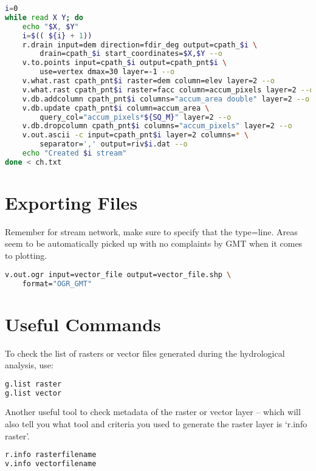 \begin{lstlisting}[language=bash]
i=0
while read X Y; do 
	echo "$X, $Y"
	i=$(( ${i} + 1))
	r.drain input=dem direction=fdir_deg output=cpath_$i \
		drain=cpath_$i start_coordinates=$X,$Y --o 
	v.to.points input=cpath_$i output=cpath_pnt$i \
		use=vertex dmax=30 layer=-1 --o
	v.what.rast cpath_pnt$i raster=dem column=elev layer=2 --o
	v.what.rast cpath_pnt$i raster=facc column=accum_pixels layer=2 --o
	v.db.addcolumn cpath_pnt$i columns="accum_area double" layer=2 --o
	v.db.update cpath_pnt$i column=accum_area \
		query_col="accum_pixels*${SQ_M}" layer=2 --o
	v.db.dropcolumn cpath_pnt$i columns="accum_pixels" layer=2 --o
	v.out.ascii -c input=cpath_pnt$i layer=2 columns=* \
		separator=',' output=riv$i.dat --o
	echo "Created $i stream"
done < ch.txt
\end{lstlisting}

\section{Exporting Files}

Remember for stream network, make sure to specify that the type=line. Areas seem to be automatically picked up with no complaints by GMT when it comes to plotting.

\begin{lstlisting}[language=bash]
v.out.ogr input=vector_file output=vector_file.shp \
	format="OGR_GMT"
\end{lstlisting} 

\section{Useful Commands}

To check the list of rasters or vector files generated during the hydrological analysis, use:

\begin{lstlisting}[language=bash]
g.list raster
g.list vector
\end{lstlisting} 

Another useful tool to check metadata of the raster or vector layer – which will also tell you what tool and criteria you used to generate the raster layer is ‘r.info raster’.

\begin{lstlisting}[language=bash]
r.info rasterfilename
v.info vectorfilename
\end{lstlisting} 






